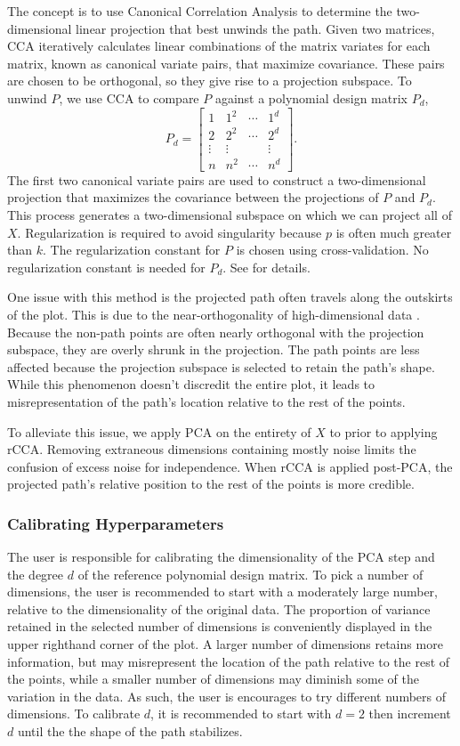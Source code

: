 \documentclass{article}
\begin{document}
{The concept is to use Canonical Correlation Analysis to determine the two-dimensional linear projection that best unwinds the path. Given two matrices, CCA iteratively calculates linear combinations of the matrix variates for each matrix, known as canonical variate pairs, that maximize covariance. These pairs are chosen to be orthogonal, so they give rise to a projection subspace. To unwind $P$, we use CCA to compare $P$ against a polynomial design matrix $P_d$, $$P_d = \begin{bmatrix}
1 & 1^2 & \cdots & 1^d \\
2 & 2^2 & \cdots & 2^d \\
\vdots & \vdots & & \vdots \\
n & n^2 & \cdots & n^d
\end{bmatrix}.$$
The first two canonical variate pairs are used to construct a two-dimensional projection that maximizes the covariance between the projections of $P$ and $P_d$. This process generates a two-dimensional subspace on which we can project all of $X$. Regularization is required to avoid singularity because $p$ is often much greater than $k$. The regularization constant for $P$ is chosen using cross-validation. No regularization constant is needed for $P_d$. See \cite{rCCA} for details.

One issue with this method is the projected path often travels along the outskirts of the plot. This is due to the near-orthogonality of high-dimensional data \cite{near-orthogonal}. Because the non-path points are often nearly orthogonal with the projection subspace, they are overly shrunk in the projection. The path points are less affected because the projection subspace is selected to retain the path's shape. While this phenomenon doesn't discredit the entire plot, it leads to misrepresentation of the path's location relative to the rest of the points.

To alleviate this issue, we apply PCA on the entirety of $X$ to prior to applying rCCA. Removing extraneous dimensions containing mostly noise limits the confusion of excess noise for independence. When rCCA is applied post-PCA, the projected path's relative position to the rest of the points is more credible.

\subsubsection{Calibrating Hyperparameters}
The user is responsible for calibrating the dimensionality of the PCA step and the degree $d$ of the reference polynomial design matrix. To pick a number of dimensions, the user is recommended to start with a moderately large number, relative to the dimensionality of the original data. The proportion of variance retained in the selected number of dimensions is conveniently displayed in the upper righthand corner of the plot. A larger number of dimensions retains more information, but may misrepresent the location of the path relative to the rest of the points, while a smaller number of dimensions may diminish some of the variation in the data. As such, the user is encourages to try different numbers of dimensions. To calibrate $d$, it is recommended to start with $d = 2$ then increment $d$ until the the shape of the path stabilizes.

}
\end{document}
